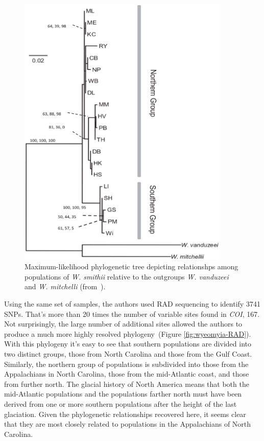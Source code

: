\begin{figure}
\begin{center}
\includegraphics[width=0.9\textwidth]{wyeomyia-COI.eps}
\end{center}
\caption{Maximum-likelihood phylogenetic tree depicting relationshps
  among populations of {\it W. smithii\/} relative to the outgroups
  {\it W. vanduzeei\/} and {\it W. mitchelli} (from~\cite{Emerson-etal-2010}).}\label{fig:wyeomyia-COI}
\end{figure}

Using the same set of samples, the authors used RAD sequencing to
identify 3741 SNPs. That's more than 20 times the number of variable
sites found in {\it COI}, 167. Not surprisingly, the large number of
additional sites allowed the authors to produce a much more highly
resolved phylogeny~(Figure \ref{fig:wyeomyia-RAD}). With this
phylogeny it's easy to see that southern populations are divided into
two distinct groups, those from North Carolina and those from the Gulf
Coast. Similarly, the northern group of populations is subdivided into
those from the Appalachians in North Carolina, those from the
mid-Atlantic coast, and those from further north. The glacial history
of North America means that both the mid-Atlantic populations and the
populations farther north must have been derived from one or more
southern populations after the height of the last glaciation. Given
the phylogenetic relationships recovered here, it seems clear that
they are most closely related to populations in the Appalachians of
North Carolina.

